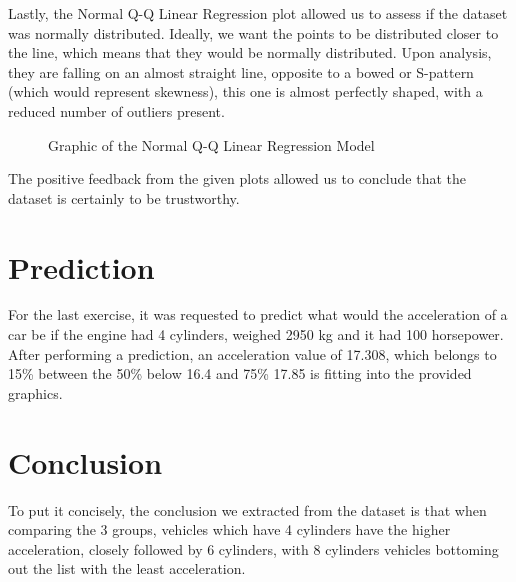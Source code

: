 \documentclass[conference]{IEEEtran}
\begin{document}
Lastly, the Normal Q-Q Linear Regression plot allowed us to assess if the dataset was normally distributed.
Ideally, we want the points to be distributed closer to the line, which means that they would be normally distributed. 
Upon analysis, they are falling on an almost straight line, opposite to a bowed or S-pattern (which would represent skewness), this one is almost perfectly shaped, 
with a reduced number of outliers present.

\begin{figure}[htbp]
    \caption{Graphic of the Normal Q-Q Linear Regression Model}
    \label{normalQQ}
\end{figure}

The positive feedback from the given plots allowed us to conclude that the dataset is certainly to be trustworthy.

\section{Prediction}

For the last exercise, it was requested to predict what would the acceleration of a car be if the engine had 4 cylinders, weighed 2950 kg and it had 100 horsepower. 
After performing a prediction, an acceleration value of 17.308, which belongs to 15\% 
between the 50\% below 16.4 and 75\% 17.85 is fitting into the provided graphics.

\section{Conclusion}

To put it concisely, the conclusion we extracted from the dataset is that when comparing the 3 groups, vehicles which have 4 cylinders have the higher acceleration, 
closely followed by 6 cylinders, with 8 cylinders vehicles bottoming out the list with the least acceleration.
\end{document}
